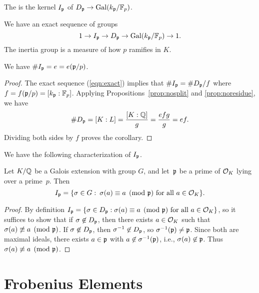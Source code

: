 \begin{definition}
	The 
	is the kernel $I_{\mathfrak{p}}$ of $D_{\mathfrak{p}}\to\operatorname{Gal}(k_{\mathfrak{p}}/\mathbb{F}_p)$.
\end{definition}
We have an exact sequence of groups
\begin{equation}\label{eqn:exact}
	1 \to I_{\mathfrak{p}} \to D_{\mathfrak{p}} \to \operatorname{Gal}(k_{\mathfrak{p}}/\mathbb{F}_p)\to 1.
\end{equation}
The inertia group is a measure of how $p$ ramifies in $K$.
\begin{corollary}
	We have $\# I_{\mathfrak{p}} = e = e(\mathfrak{p}/p)$.
\end{corollary}
\begin{proof}
	The exact sequence (\ref{eqn:exact}) implies that
	$\#I_{\mathfrak{p}} = \#D_{\mathfrak{p}} / f$ where $f = f(\mathfrak{p}/p) = [k_{\mathfrak{p}} : \mathbb{F}_p]$.
	Applying Propositions~\ref{prop:nosplit} and \ref{prop:noresidue}, we have
	$$\#D_{\mathfrak{p}} = [K:L] = \frac{[K:\mathbb{Q}]}{g} = \frac{efg}{g} = ef.$$
	Dividing both sides by $f$ proves the corollary.
\end{proof}

We have the following characterization of $I_{\mathfrak{p}}$.
\begin{proposition}\label{prop:charip}
	Let $K/\mathbb{Q}$ be a Galois extension with group $G$,
	and let~$\mathfrak{p}$ be a prime of $\mathcal{O}_K$ lying
	over a prime~$p$.  Then
	$$
		I_{\mathfrak{p}} = \{\sigma\in G \, \colon\, \sigma(a) \equiv a\pmod{\mathfrak{p}}\text{ for all } a\in\mathcal{O}_K\}.
	$$
\end{proposition}
\begin{proof}
	By definition $I_{\mathfrak{p}} = \{\sigma\in D_{\mathfrak{p}} : \sigma(a) \equiv
	a\pmod{\mathfrak{p}}\text{ for all } a\in\mathcal{O}_K\}$, so it suffices to show that
	if $\sigma\not\in D_{\mathfrak{p}}$, then there exists $a\in\mathcal{O}_K$ such that
	$\sigma(a)\not\equiv a\pmod{\mathfrak{p}}$.  If $\sigma\not\in D_{\mathfrak{p}}$, then
	$\sigma^{-1}\not\in D_{\mathfrak{p}}$, so $\sigma^{-1}(\mathfrak{p})\neq \mathfrak{p}$.  Since both
	are maximal ideals, there exists $a\in\mathfrak{p}$ with
	$a\not\in\sigma^{-1}(\mathfrak{p})$, i.e., $\sigma(a)\not\in\mathfrak{p}$.  Thus
	$\sigma(a)\not\equiv a\pmod{\mathfrak{p}}$.
\end{proof}



\section{Frobenius Elements}

